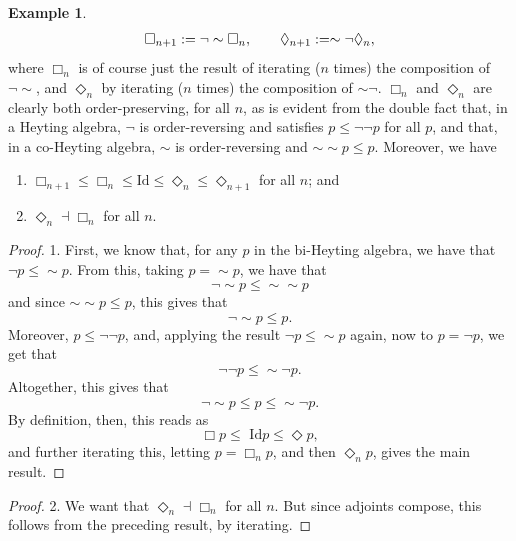 \documentclass[a4paper]{book}
\theoremstyle{definition}
\newtheorem{example}{Example}[section]
\theoremstyle{definition}
\theoremstyle{definition}
\theoremstyle{theorem}
\theoremstyle{definition}
\begin{document}
\begin{example}
	\begin{equation*}
	\Box_{n+1} := \neg \sim \Box_n, \hspace*{2em} \Diamond_{n+1} :=  \sim \neg \Diamond_n,
	\end{equation*}
	where $\Box_n$ is of course just the result of iterating ($n$ times) the composition of $\neg \sim$, and $\Diamond_n$ by iterating ($n$ times) the composition of $\sim \neg$. $\Box_n$ and $\Diamond_n$ are clearly both order-preserving, for all $n$, as is evident from the double fact that, in a Heyting algebra, $\neg$ is order-reversing and satisfies $p \leq \neg \neg p$ for all $p$, and that, in a co-Heyting algebra, $\sim$ is order-reversing and $\sim \sim p \leq p$. Moreover, we have 
	\begin{enumerate}
		\item $\Box_{n+1} \leq \Box_n \leq \text{Id} \leq \Diamond_n \leq \Diamond_{n+1}$ for all $n$; and 
		\item $\Diamond_n \dashv \Box_n$ for all $n$. 
	\end{enumerate}  
	\begin{proof}
		1. First, we know that, for any $p$ in the bi-Heyting algebra, we have that $\neg p \leq \sim p$. From this, taking $p = \sim p$, we have that 
		\begin{equation*}
		\neg \sim p \leq \sim \sim p
		\end{equation*}
		and since $\sim \sim p \leq p$, this gives that 
		\begin{equation*}
		\neg \sim p \leq p. 
		\end{equation*}
		Moreover, $p \leq \neg \neg p$, and, applying the result $\neg p \leq \sim p$ again, now to $p = \neg p$, we get that 
		\begin{equation*}
		\neg \neg p \leq \sim \neg p.
		\end{equation*}
		Altogether, this gives that 
		\begin{equation*}
		\neg \sim p \leq p \leq \sim \neg p. 
		\end{equation*} 
		By definition, then, this reads as 
		\begin{equation*}
		\Box p \leq \text{ Id} p \leq \Diamond p, 
		\end{equation*}
		and further iterating this, letting $p = \Box_n p$, and then $\Diamond_n p$, gives the main result.  
	\end{proof}
	\begin{proof}
		2. We want that $\Diamond_n \dashv \Box_n$ for all $n$. But since adjoints compose, this follows from the preceding result, by iterating.

\end{proof}
\end{example}
\end{document}
